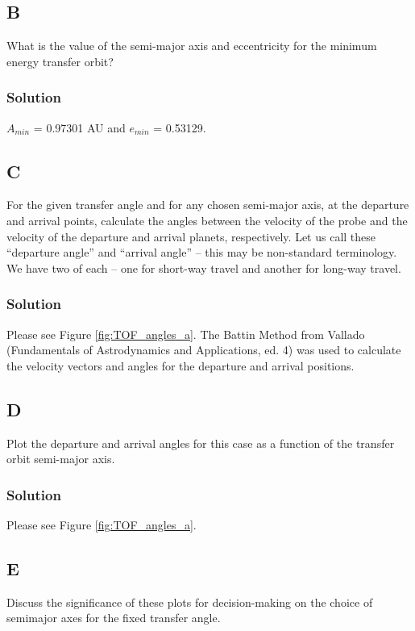 \documentclass[conf]{new-aiaa}
\begin{document}
\subsection*{B}
What is the value of the semi-major axis and eccentricity for the minimum energy
transfer orbit?

\subsubsection*{Solution}

$A_{min}$ = 0.97301 AU and $e_{min}$ = 0.53129. 

\subsection*{C}
For the given transfer angle and for any chosen semi-major axis, at the departure
and arrival points, calculate the angles between the velocity of the probe and the
velocity of the departure and arrival planets, respectively. Let us call these
“departure angle” and “arrival angle” – this may be non-standard terminology.
We have two of each – one for short-way travel and another for long-way travel.

\subsubsection*{Solution}

Please see Figure \ref{fig:TOF_angles_a}. The Battin Method from Vallado (Fundamentals of Astrodynamics and Applications, ed. 4) was used to calculate the velocity vectors and angles for the departure and arrival positions. 

\subsection*{D}
Plot the departure and arrival angles for this case as a function of the transfer orbit
semi-major axis.

\subsubsection*{Solution}

Please see Figure \ref{fig:TOF_angles_a}. 

\subsection*{E}
Discuss the significance of these plots for decision-making on the choice of semimajor axes for the fixed transfer angle.
\end{document}
